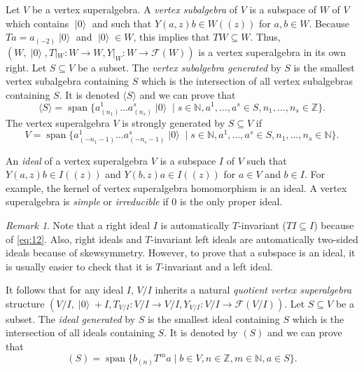 \documentclass[a4paper, 12pt, reqno]{amsart}
\theoremstyle{remark}
\newtheorem{remark}[theorem]{Remark}
\numberwithin{equation}{subsection}
\DeclareMathOperator{\vspan}{span}
\DeclareMathOperator{\vac}{|0\rangle}
\begin{document}
Let $V$ be a vertex superalgebra.
A \emph{vertex subalgebra} of $V$ is a subspace of $W$ of $V$ which contains $\vac$ and such that $Y(a, z)b \in W((z))$ for $a, b \in W$.
Because $Ta = a_{(-2)}\vac$ and $\vac \in W$, this implies that $TW \subseteq W$.
Thus, $(W, \vac, T|_{W}: W \to W, Y|_{W}: W \to \mathcal{F}(W))$ is a vertex superalgebra in its own right.
Let $S \subseteq V$ be a subset.
The \emph{vertex subalgebra generated} by $S$ is the smallest vertex subalgebra containing $S$ which is the intersection of all vertex subalgebras containing $S$.
It is denoted $\langle S \rangle$ and we can prove that
\begin{equation*}
  \langle S \rangle = \vspan\{a^1_{(n_1)}\dots a^s_{(n_s)}\vac \mid s \in \mathbb{N}, a^1, \dots, a^s \in S, n_1, \dots, n_s \in \mathbb{Z}\}.
\end{equation*}
The vertex superalgebra $V$ is strongly generated by $S \subseteq V$ if
\begin{equation*}
  V = \vspan\{a^1_{(-n_1 - 1)}\dots a^s_{(-n_s - 1)}\vac \mid s \in \mathbb{N}, a^1, \dots, a^s \in S, n_1, \dots, n_s \in \mathbb{N}\}.
\end{equation*}

An \emph{ideal} of a vertex superalgebra $V$ is a subspace $I$ of $V$ such that $Y(a, z)b \in I((z))$ and $Y(b, z)a \in I((z))$ for $a \in V$ and $b \in I$.
For example, the kernel of vertex superalgebra homomorphism is an ideal.
A vertex superalgebra is \emph{simple} or \emph{irreducible} if $0$ is the only proper ideal.

\begin{remark}
  \label{rmk:13}
  Note that a right ideal $I$ is automatically $T$-invariant ($TI \subseteq I$) because of \eqref{eq:12}.
  Also, right ideals and $T$-invariant left ideals are automatically two-sided ideals because of skewsymmetry.
  However, to prove that a subspace is an ideal, it is usually easier to check that it is $T$-invariant and a left ideal.
\end{remark}

It follows that for any ideal $I$, $V/I$ inherits a natural \emph{quotient vertex superalgebra} structure $(V/I, \vac + I, T_{V/I}: V/I \to V/I, Y_{V/I}: V/I \to \mathcal{F}(V/I))$.
Let $S \subseteq V$ be a subset.
The \emph{ideal generated} by $S$ is the smallest ideal containing $S$ which is the intersection of all ideals containing $S$.
It is denoted by $(S)$ and we can prove that
\begin{equation*}
  (S) = \vspan\{b_{(n)}T^ma \mid b \in V, n \in \mathbb{Z}, m \in \mathbb{N}, a \in S\}.
\end{equation*}
\end{document}
